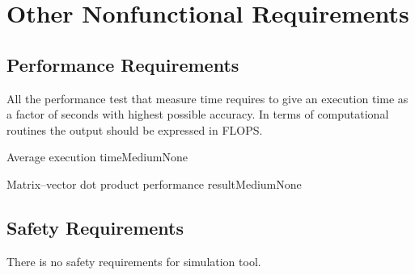 
\chapter{Other Nonfunctional Requirements} \label{chp:other-nonfunctional-requirements}

\section{Performance Requirements}
	\begin{comment}
		$<$If there are performance requirements for the product under various 
		circumstances, state them here and explain their rationale, to help the 
		developers understand the intent and make suitable design choices. Specify the 
		timing relationships for real time systems. Make such requirements as specific 
		as possible. You may need to state performance requirements for individual 
		functional requirements or features.$>$
	\end{comment}
	
	All the performance test that measure time requires to give an execution time as a factor of seconds with highest possible accuracy. In terms of computational routines the output should be expressed in \gls{FLOPS}.
	
	\begin{functional}{Average execution time}{Medium}{None}
		\label{s:performance-requirements:average-exectution-time}
	\end{functional}

	\begin{functional}{Matrix--vector dot product performance result}{Medium}{None}
		\label{s:performance-requirements:performance-result}
	\end{functional}
\section{Safety Requirements}
	\begin{comment}
		$<$Specify those requirements that are concerned with possible loss, damage, or 
		harm that could result from the use of the product. Define any safeguards or 
		actions that must be taken, as well as actions that must be prevented. Refer to 
		any external policies or regulations that state safety issues that affect the 
		product’s design or use. Define any safety certifications that must be 
		satisfied.$>$
	\end{comment}
	There is no safety requirements for simulation tool.
